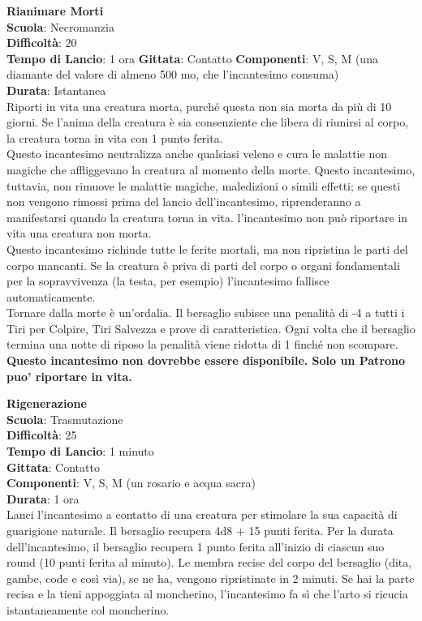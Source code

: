 \begin{multicols}{2}
\medskip\textbf{Rianimare Morti}\\
\textbf{Scuola}: Necromanzia\\
\textbf{Difficoltà}:  20\\
\textbf{Tempo di Lancio}: 1 ora
\textbf{Gittata}: Contatto
\textbf{Componenti}: V, S, M (una diamante del valore di almeno 500 mo, che l'incantesimo consuma)\\
\textbf{Durata}: Istantanea\\
Riporti in vita una creatura morta, purché questa non sia morta da più di 10 giorni. Se l’anima della creatura è sia consenziente che libera di riunirsi al corpo, la creatura torna in vita con 1 punto ferita.\\
Questo incantesimo neutralizza anche qualsiasi veleno e cura le malattie non magiche che affliggevano la creatura al momento della morte. Questo incantesimo, tuttavia, non rimuove le malattie magiche, maledizioni o simili effetti; se questi non vengono rimossi prima del lancio dell'incantesimo, riprenderanno a manifestarsi quando la creatura torna in vita. l'incantesimo non può riportare in vita una creatura non morta.\\
Questo incantesimo richiude tutte le ferite mortali, ma non ripristina le parti del corpo mancanti. Se la creatura è priva di parti del corpo o organi fondamentali per la sopravvivenza (la testa, per esempio) l'incantesimo fallisce automaticamente.\\
Tornare dalla morte è un'ordalia. Il bersaglio subisce una penalità di -4 a tutti i Tiri per Colpire, Tiri Salvezza e prove di caratteristica. Ogni volta che il bersaglio termina una notte di riposo la penalità viene ridotta di 1 finché non scompare.\\
\textbf{Questo incantesimo non dovrebbe essere disponibile. Solo un Patrono puo' riportare in vita.}

\medskip\textbf{Rigenerazione}\\
\textbf{Scuola}: Trasmutazione\\
\textbf{Difficoltà}:  25\\
\textbf{Tempo di Lancio}: 1 minuto\\
\textbf{Gittata}: Contatto\\
\textbf{Componenti}: V, S, M (un rosario e acqua sacra)\\
\textbf{Durata}: 1 ora\\
Lanci l'incantesimo a contatto di una creatura per stimolare la sua capacità di guarigione naturale. Il bersaglio recupera 4d8 + 15 punti ferita. Per la durata dell'incantesimo, il bersaglio recupera 1 punto ferita all'inizio di ciascun suo round (10 punti ferita al minuto). Le membra recise del corpo del bersaglio (dita, gambe, code e così via), se ne ha, vengono ripristinate in 2 minuti. Se hai la parte recisa e la tieni appoggiata al moncherino, l'incantesimo fa sì che l’arto si ricucia istantaneamente col moncherino.


\end{multicols}
